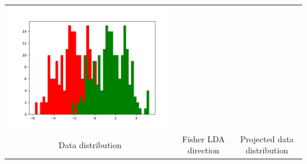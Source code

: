 \documentclass{article}
\begin{document}
\begin{center}
\begin{tabular}{ccc}
\includegraphics[scale=0.25]{flda_roc_prj_hist} \\
\scriptsize Data distribution & 
\scriptsize Fisher LDA direction &
\scriptsize Projected data distribution
\end{tabular}
\end{center}
\end{document}
